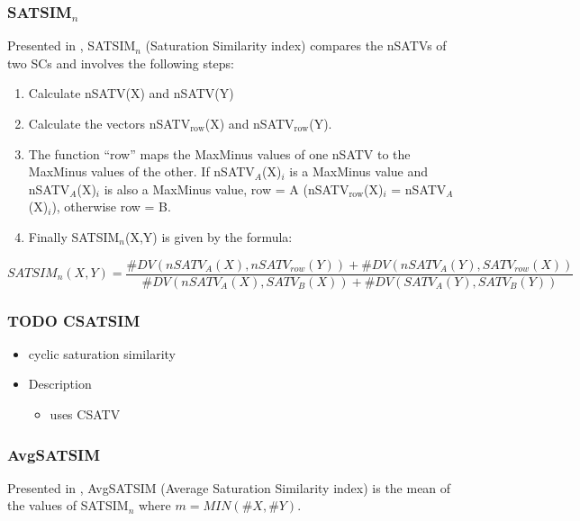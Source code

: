\documentclass{article}
\begin{document}
\subsubsection{SATSIM$_{n}$}
\label{sec-11-9-2}

Presented in \citet[chap. 2.4]{Buchler1997}, SATSIM$_{n}$ (Saturation
Similarity index) compares the nSATVs of two SCs and involves the
following steps:
\begin{enumerate}
\item Calculate nSATV(X) and nSATV(Y)
\item Calculate the vectors nSATV$_{\mathrm{row}}$(X) and nSATV$_{\mathrm{row}}$(Y).
\item The function ``row'' maps the MaxMinus values of one nSATV to the
   MaxMinus values of the other. If nSATV$_{A}$(X)$_{i}$ is a MaxMinus
   value and nSATV$_{A}$(X)$_{i}$ is also a MaxMinus value, row = A
   (nSATV$_{\mathrm{row}}$(X)$_{i}$ = nSATV$_{A}$(X)$_{i}$), otherwise row = B.
\item Finally SATSIM$_{n}$(X,Y) is given by the formula:
\end{enumerate}

$$SATSIM_{n}(X,Y)=\frac{\#DV(nSATV_{A}(X),nSATV_{row}(Y))+\#DV(nSATV_{A}(Y),SATV_{row}(X))}{\#DV(nSATV_{A}(X),SATV_{B}(X))+\#DV(SATV_{A}(Y),SATV_{B}(Y))}$$
\subsubsection{\textbf{TODO} CSATSIM}
\label{sec-11-9-3}

\begin{itemize}
\item cyclic saturation similarity
\end{itemize}
\begin{itemize}

\item Description
\label{sec-11-9-3-1}%
\begin{itemize}
\item uses CSATV
\end{itemize}
\end{itemize} %
\subsubsection{AvgSATSIM}
\label{sec-11-9-4}

Presented in \citet[chap. 2.10]{Buchler1997}, AvgSATSIM (Average
Saturation Similarity index) is the mean of the values of SATSIM$_{n}$
where $m = MIN(\#X,\#Y)$.
\end{document}
